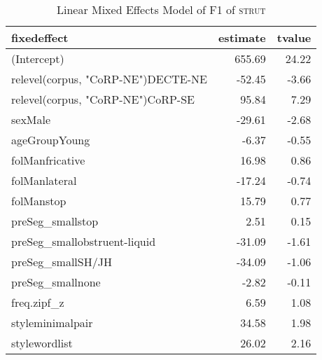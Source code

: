 \begin{table}[ht]
\centering
\begin{tabular}{lrr}
  \hline
fixedeffect & estimate & tvalue \\ 
  \hline
(Intercept) & 655.69 & 24.22 \\ 
  relevel(corpus, "CoRP-NE")DECTE-NE & -52.45 & -3.66 \\ 
  relevel(corpus, "CoRP-NE")CoRP-SE & 95.84 & 7.29 \\ 
  sexMale & -29.61 & -2.68 \\ 
  ageGroupYoung & -6.37 & -0.55 \\ 
  folManfricative & 16.98 & 0.86 \\ 
  folManlateral & -17.24 & -0.74 \\ 
  folManstop & 15.79 & 0.77 \\ 
  preSeg\_smallstop & 2.51 & 0.15 \\ 
  preSeg\_smallobstruent-liquid & -31.09 & -1.61 \\ 
  preSeg\_smallSH/JH & -34.09 & -1.06 \\ 
  preSeg\_smallnone & -2.82 & -0.11 \\ 
  freq.zipf\_z & 6.59 & 1.08 \\ 
  styleminimalpair & 34.58 & 1.98 \\ 
  stylewordlist & 26.02 & 2.16 \\ 
   \hline
\end{tabular}
\caption{Linear Mixed Effects Model of F1 of \textsc{strut} \label{tbl:SF1}} 
\end{table}
